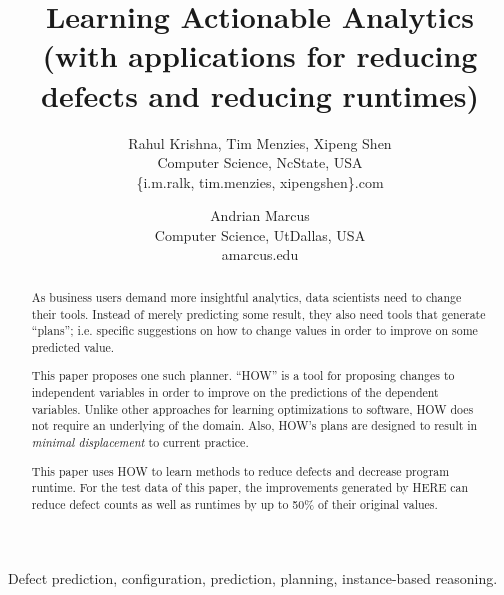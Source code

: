 \documentclass[conference]{IEEEtran}
\title{Learning Actionable Analytics 
 (with applications for reducing defects and reducing runtimes)}
\author{
%
%
Rahul Krishna, Tim Menzies, Xipeng Shen\\
        Computer Science, NcState, USA\\
       \{i.m.ralk, tim.menzies, xipengshen\}\@gmail.com
\and
 Andrian Marcus\\
       Computer Science, UtDallas, USA \\
       amarcus\@utdallas.edu }
\begin{document}
  \maketitle
  
  
   
  \begin{abstract}
 As business users demand more insightful
 analytics, data scientists need to change
 their tools. Instead of merely predicting 
 some result, they also need tools that generate ``plans'';
 i.e. specific suggestions on  how to change values in order to
 improve on some predicted value.
 
 This paper proposes one such planner. ``HOW'' is a 
 tool for proposing changes to independent
 variables in order to improve on 
 the predictions of the dependent variables. Unlike other approaches
 for learning optimizations to software, HOW does not require
 an underlying of the domain. Also, HOW's plans
 are designed to result in {\em minimal displacement}
 to current practice.
 
 This paper uses  HOW to learn methods
 to reduce defects and decrease program runtime.
 For the test data of this paper, the improvements generated by HERE can reduce
 defect counts as well as runtimes by up to
 50\% of their original values.
  \end{abstract}
  \begin{IEEEkeywords}
Defect prediction, configuration, prediction, planning, instance-based reasoning.
  \end{IEEEkeywords}
  
\end{document}

